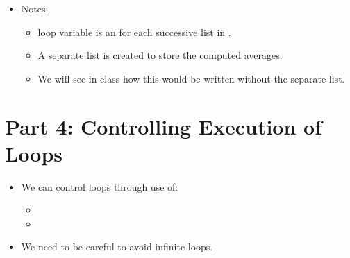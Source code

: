 \documentclass[letterpaper,10pt,english]{sphinxmanual}
\begin{document}
\begin{itemize}
\item {} 
Notes:
\begin{itemize}
\item {} 
 loop variable  is an  for each successive
list in .

\item {} 
A separate list is created to store the computed averages.

\item {} 
We will see in class how this would be written without the
separate  list.

\end{itemize}

\end{itemize}


\section{Part 4: Controlling Execution of Loops}
\label{\detokenize{lecture_notes/lec12_loops2_for_double:part-4-controlling-execution-of-loops}}\begin{itemize}
\item {} 
We can control loops through use of:
\begin{itemize}
\item {} 

\item {} 

\end{itemize}

\item {} 
We need to be careful to avoid infinite loops.

\end{itemize}
\end{document}
